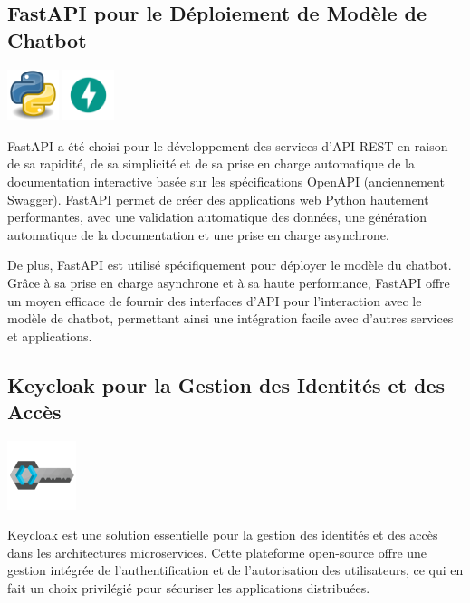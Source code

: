 \documentclass[a4paper, 11pt, openany]{report}
\begin{document}
\subsection{FastAPI pour le Déploiement de Modèle de Chatbot}
\begin{center}
\includegraphics[height=1.5cm]{python.png}
\includegraphics[height=1.5cm]{fastapi.png}
\end{center}

FastAPI a été choisi pour le développement des services d'API REST en raison de sa rapidité, de sa simplicité et de sa prise en charge automatique de la documentation interactive basée sur les spécifications OpenAPI (anciennement Swagger). FastAPI permet de créer des applications web Python hautement performantes, avec une validation automatique des données, une génération automatique de la documentation et une prise en charge asynchrone.


De plus, FastAPI est utilisé spécifiquement pour déployer le modèle du chatbot. Grâce à sa prise en charge asynchrone et à sa haute performance, FastAPI offre un moyen efficace de fournir des interfaces d'API pour l'interaction avec le modèle de chatbot, permettant ainsi une intégration facile avec d'autres services et applications.






\subsection{Keycloak pour la Gestion des Identités et des Accès}
\begin{center}
\includegraphics[height=2cm]{images/keycloak.png}
\end{center}

Keycloak est une solution essentielle pour la gestion des identités et des accès dans les architectures microservices. Cette plateforme open-source offre une gestion intégrée de l'authentification et de l'autorisation des utilisateurs, ce qui en fait un choix privilégié pour sécuriser les applications distribuées.
\end{document}
